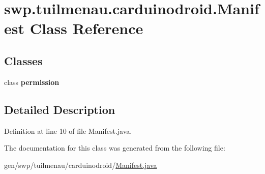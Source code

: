 \hypertarget{classswp_1_1tuilmenau_1_1carduinodroid_1_1_manifest}{}\section{swp.\+tuilmenau.\+carduinodroid.\+Manifest Class Reference}
\label{classswp_1_1tuilmenau_1_1carduinodroid_1_1_manifest}
\subsection*{Classes}
\begin{DoxyCompactItemize}
\item 
class {\bfseries permission}
\end{DoxyCompactItemize}


\subsection{Detailed Description}


Definition at line 10 of file Manifest.\+java.



The documentation for this class was generated from the following file\+:\begin{DoxyCompactItemize}
\item 
gen/swp/tuilmenau/carduinodroid/\hyperlink{_manifest_8java}{Manifest.\+java}\end{DoxyCompactItemize}
